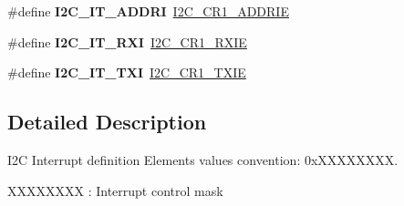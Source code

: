 \begin{DoxyCompactItemize}
\item 
\mbox{\label{group___i2_c___interrupt__configuration__definition_ga2a4058126bd3d7ea36eedfbc0f0d926d}} 
\#define {\bfseries I2\+C\+\_\+\+I\+T\+\_\+\+A\+D\+D\+RI}~\hyperlink{group___peripheral___registers___bits___definition_ga275e85befdb3d7ea7b5eb402cec574ec}{I2\+C\+\_\+\+C\+R1\+\_\+\+A\+D\+D\+R\+IE}
\item 
\mbox{\label{group___i2_c___interrupt__configuration__definition_ga37af8a13ac5afcbd22cec22f471543ce}} 
\#define {\bfseries I2\+C\+\_\+\+I\+T\+\_\+\+R\+XI}~\hyperlink{group___peripheral___registers___bits___definition_gaf1fc89bf142bfc08ee78763e6e27cd80}{I2\+C\+\_\+\+C\+R1\+\_\+\+R\+X\+IE}
\item 
\mbox{\label{group___i2_c___interrupt__configuration__definition_gae0ed342e48cfd545190da23791980c35}} 
\#define {\bfseries I2\+C\+\_\+\+I\+T\+\_\+\+T\+XI}~\hyperlink{group___peripheral___registers___bits___definition_ga8bd36da8f72bc91040e63af07dd6b5a4}{I2\+C\+\_\+\+C\+R1\+\_\+\+T\+X\+IE}
\end{DoxyCompactItemize}


\subsection{Detailed Description}
I2C Interrupt definition Elements values convention\+: 0x\+X\+X\+X\+X\+X\+X\+XX. 


\begin{DoxyItemize}
\item X\+X\+X\+X\+X\+X\+XX \+: Interrupt control mask 
\end{DoxyItemize}
